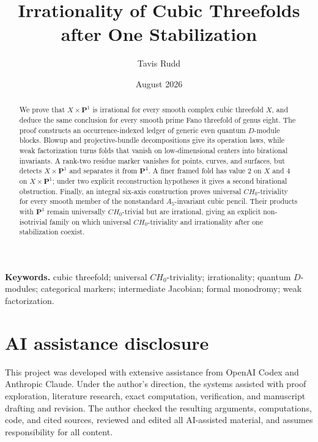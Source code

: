 \documentclass[11pt]{article}
\title{Irrationality of Cubic Threefolds after One Stabilization}
\author{Tavis Rudd}
\date{August 2026}
\numberwithin{equation}{section}
\theoremstyle{definition}
\theoremstyle{remark}
\newcommand{\PP}{\mathbf P}
\begin{document}
\maketitle

\begin{abstract}
We prove that \(X\times\PP^1\) is irrational for every smooth complex cubic
threefold \(X\), and deduce the same conclusion for every smooth prime Fano
threefold of genus eight.  The proof constructs an occurrence-indexed ledger
of generic even quantum \(D\)-module blocks.  Blowup and projective-bundle
decompositions give its operation laws, while weak factorization turns folds
that vanish on low-dimensional centers into birational invariants.  A
rank-two residue marker vanishes for points, curves, and surfaces, but detects
\(X\times\PP^1\) and separates it from \(\PP^4\).  A finer framed fold has
value \(2\) on \(X\) and \(4\) on \(X\times\PP^1\); under two explicit
reconstruction hypotheses it gives a second birational obstruction.
Finally, an integral six-axis construction proves universal
\(CH_0\)-triviality for every smooth member of the nonstandard
\(A_5\)-invariant cubic pencil.  Their products with \(\PP^1\) remain
universally \(CH_0\)-trivial but are irrational, giving an explicit
non-isotrivial family on which universal \(CH_0\)-triviality and irrationality
after one stabilization coexist.
\end{abstract}

\noindent\textbf{Keywords.} cubic threefold; universal \(CH_0\)-triviality;
irrationality; quantum \(D\)-modules; categorical markers; intermediate
Jacobian; formal monodromy; weak factorization.








\section*{AI assistance disclosure}

This project was developed with extensive assistance from OpenAI Codex and
Anthropic Claude. Under the author's direction, the systems assisted with
proof exploration, literature research, exact computation, verification,
and manuscript drafting and revision. The author checked the resulting
arguments, computations, code, and cited sources, reviewed and edited all
AI-assisted material, and assumes responsibility for all content.
\end{document}
